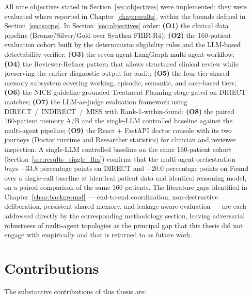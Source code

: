 All nine objectives stated in Section~\ref{sec:objectives} were
implemented; they were evaluated where reported in
Chapter~\ref{chap:results}, within the bounds defined in
Section~\ref{sec:scope}. In Section~\ref{sec:objectives} order:
\textbf{(O1)} the clinical data pipeline (Bronze/Silver/Gold over
Synthea FHIR-R4);
\textbf{(O2)} the 160-patient evaluation cohort built by the
deterministic eligibility rules and the LLM-based detectability
verifier;
\textbf{(O3)} the seven-agent LangGraph multi-agent workflow;
\textbf{(O4)} the Reviewer-Refiner pattern that allows structured
clinical review while preserving the earlier diagnostic output for
audit;
\textbf{(O5)} the four-tier shared-memory subsystem covering working,
episodic, semantic, and case-based tiers;
\textbf{(O6)} the NICE-guideline-grounded Treatment Planning stage
gated on DIRECT matches;
\textbf{(O7)} the LLM-as-judge evaluation framework using
DIRECT~/~INDIRECT~/~MISS with Rank-1-within-found;
\textbf{(O8)} the paired 160-patient memory A/B and the single-LLM
controlled baseline against the multi-agent pipeline;
\textbf{(O9)} the React + FastAPI doctor console with its two journeys
(Doctor runtime and Researcher statistics) for clinician and reviewer
inspection.
A single-LLM controlled baseline on the same 160-patient cohort
(Section~\ref{sec:results_single_llm}) confirms that the multi-agent
orchestration buys $+33.8$ percentage points on DIRECT and
$+20.0$ percentage points on Found over a single-call baseline at
identical patient data and identical reasoning model, on a paired
comparison of the same 160 patients.
The literature gaps identified in Chapter~\ref{chap:background} --- end-to-end
coordination, non-destructive deliberation, persistent shared memory, and
leakage-aware evaluation --- are each addressed directly by the
corresponding methodology section, leaving adversarial robustness of
multi-agent topologies as the principal gap that this thesis did not
engage with empirically and that is returned to as future work.

\section{Contributions}
\label{sec:concl_contributions}

The substantive contributions of this thesis are:

